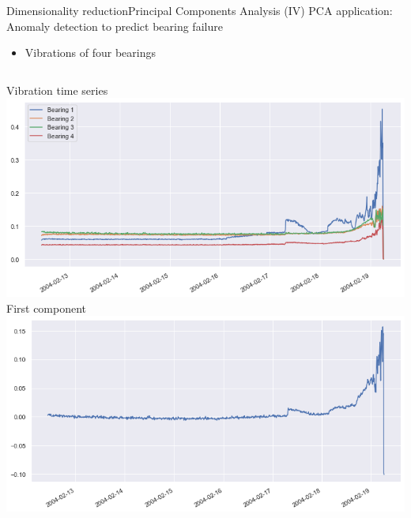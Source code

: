 \documentclass[10pt,compress]{beamer} %
\begin{document}
\begin{frame}[plain]{Dimensionality reduction}{Principal Components Analysis (IV)}
	PCA application: Anomaly detection to predict bearing failure
		\begin{itemize}
            \item Vibrations of four bearings
		\end{itemize}

    \begin{columns}
            Vibration time series
			\includegraphics[width=\linewidth]{figs/bearings1.png}
            First component
			\includegraphics[width=\linewidth]{figs/bearingspca.png}
    \end{columns}


\end{frame}
\end{document}
